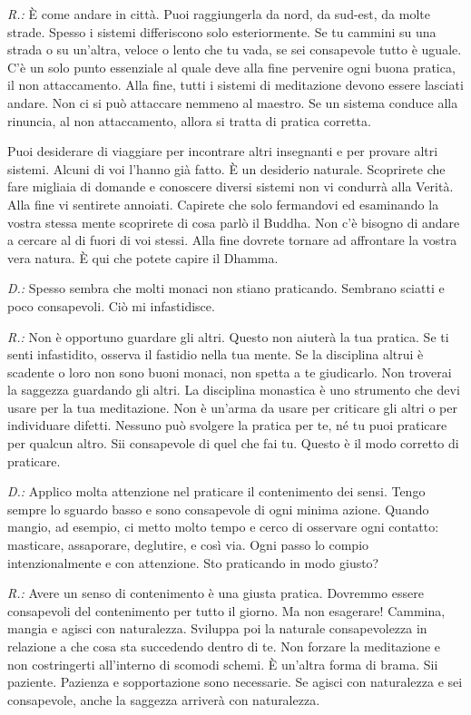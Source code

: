 \emph{R.:} È come andare in città. Puoi raggiungerla da nord, da sud-est, da
molte strade. Spesso i sistemi differiscono solo esteriormente. Se tu
cammini su una strada o su un'altra, veloce o lento che tu vada, se sei
consapevole tutto è uguale. C'è un solo punto essenziale al quale deve
alla fine pervenire ogni buona pratica, il non attaccamento. Alla fine,
tutti i sistemi di meditazione devono essere lasciati andare. Non ci si
può attaccare nemmeno al maestro. Se un sistema conduce alla rinuncia,
al non attaccamento, allora si tratta di pratica corretta.

Puoi desiderare di viaggiare per incontrare altri insegnanti e per
provare altri sistemi. Alcuni di voi l'hanno già fatto. È un desiderio
naturale. Scoprirete che fare migliaia di domande e conoscere diversi
sistemi non vi condurrà alla Verità. Alla fine vi sentirete annoiati.
Capirete che solo fermandovi ed esaminando la vostra stessa mente
scoprirete di cosa parlò il Buddha. Non c'è bisogno di andare a cercare
al di fuori di voi stessi. Alla fine dovrete tornare ad affrontare la
vostra vera natura. È qui che potete capire il Dhamma.

\emph{D.:} Spesso sembra che molti monaci non stiano praticando. Sembrano
sciatti e poco consapevoli. Ciò mi infastidisce.

\emph{R.:} Non è opportuno guardare gli altri. Questo non aiuterà la tua
pratica. Se ti senti infastidito, osserva il fastidio nella tua mente.
Se la disciplina altrui è scadente o loro non sono buoni monaci, non
spetta a te giudicarlo. Non troverai la saggezza guardando gli altri. La
disciplina monastica è uno strumento che devi usare per la tua
meditazione. Non è un'arma da usare per criticare gli altri o per
individuare difetti. Nessuno può svolgere la pratica per te, né tu puoi
praticare per qualcun altro. Sii consapevole di quel che fai tu. Questo
è il modo corretto di praticare.

\emph{D.:} Applico molta attenzione nel praticare il contenimento dei sensi.
Tengo sempre lo sguardo basso e sono consapevole di ogni minima azione.
Quando mangio, ad esempio, ci metto molto tempo e cerco di osservare
ogni contatto: masticare, assaporare, deglutire, e così via. Ogni passo
lo compio intenzionalmente e con attenzione. Sto praticando in modo
giusto?

\emph{R.:} Avere un senso di contenimento è una giusta pratica. Dovremmo essere
consapevoli del contenimento per tutto il giorno. Ma non esagerare!
Cammina, mangia e agisci con naturalezza. Sviluppa poi la naturale
consapevolezza in relazione a che cosa sta succedendo dentro di te. Non
forzare la meditazione e non costringerti all'interno di scomodi schemi.
È un'altra forma di brama. Sii paziente. Pazienza e sopportazione sono
necessarie. Se agisci con naturalezza e sei consapevole, anche la
saggezza arriverà con naturalezza.

